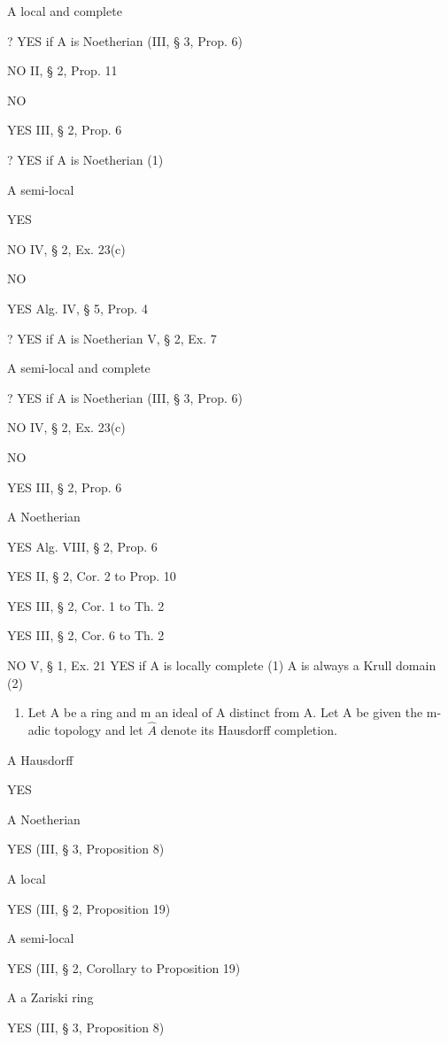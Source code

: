 A local and complete

? YES if A is Noetherian (III, § 3, Prop. 6)

NO II, § 2, Prop. 11

NO

YES III, § 2, Prop. 6

? YES if A is Noetherian (1)

A semi-local

YES

NO IV, § 2, Ex. 23(c)

NO

YES Alg. IV, § 5, Prop. 4

? YES if A is Noetherian V, § 2, Ex. 7

A semi-local and complete

? YES if A is Noetherian (III, § 3, Prop. 6)

NO IV, § 2, Ex. 23(c)

NO

YES III, § 2, Prop. 6

A Noetherian

YES Alg. VIII, § 2, Prop. 6

YES II, § 2, Cor. 2 to Prop. 10

YES III, § 2, Cor. 1 to Th. 2

YES III, § 2, Cor. 6 to Th. 2

NO V, § 1, Ex. 21 YES if A is locally complete (1) A\textquotesingle{} is always a Krull domain (2)


\begin{enumerate}
\def\labelenumi{(\alph{enumi})}
\tightlist
\item
  Let A be a ring and m an ideal of A distinct from A. Let A be given the m-adic topology and let \(\hat{A}\) denote its Hausdorff completion.
\end{enumerate}

A Hausdorff

YES

A Noetherian

YES (III, § 3, Proposition 8)

A local

YES (III, § 2, Proposition 19)

A semi-local

YES (III, § 2, Corollary to Proposition 19)

A a Zariski ring

YES (III, § 3, Proposition 8)

